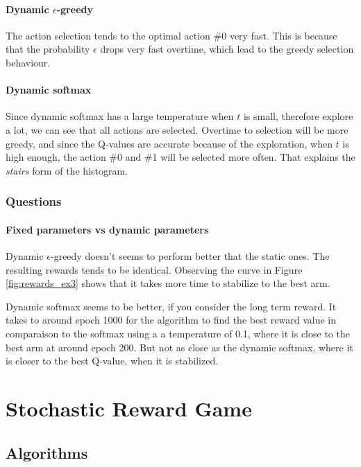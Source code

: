 \documentclass[letterpaper]{article}
\begin{document}
\paragraph{Dynamic $\epsilon$-greedy}

The action selection tends to the optimal action \#0 very fast. This
is because that the probability $\epsilon$ drops very fast overtime, which
lead to the greedy selection behaviour.

\paragraph{Dynamic softmax}

Since dynamic softmax has a large temperature when $t$ is small, therefore
explore a lot, we can see that all actions are selected. Overtime
to selection will be more greedy, and since the Q-values are accurate
because of the exploration, when $t$ is high enough, the action \#0 and \#1
will be selected more often. That explains the \textit{stairs} form
of the histogram.

\subsubsection{Questions}

\paragraph{Fixed parameters vs dynamic parameters}

Dynamic $\epsilon$-greedy
doesn't seems to perform better that the static ones.
The resulting rewards tends to be identical. Observing the curve
in Figure \ref{fig:rewards_ex3} shows
that it takes more time to stabilize to the best arm.

Dynamic softmax seems to be better, if you consider the long term reward.
It takes to around epoch
1000 for the algorithm to find the best reward value in
comparaison to the softmax using a a temperature of 0.1, where it
is close to the best arm at around epoch 200. But not as close as
the dynamic softmax, where it is closer to the best Q-value, when it
is stabilized.


\section{Stochastic Reward Game}

\subsection{Algorithms}
\end{document}
